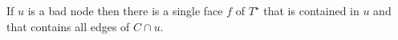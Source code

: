 \documentclass[a4paper,UKenglish]{socg-lipics-v2019}
\newcommand{\dual}[1]{{#1}^\star}
\begin{document}
\begin{lem}
   If $u$ is a bad node then there is a single face $f$ of $\dual{T}$
   that is contained in $u$ and that contains all edges of $C\cap u$.
\end{lem}

%
%
%
%
\end{document}

